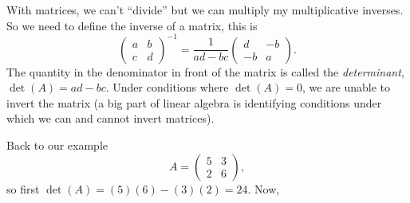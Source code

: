 \documentclass{article}
\begin{document}
With matrices, we can't ``divide'' but we can multiply my multiplicative inverses. So we need to define the inverse of a matrix, this is \[\begin{pmatrix}a&b\\c&d\end{pmatrix}^{-1} = \frac{1}{ad-bc}\begin{pmatrix}d&-b\\-b&a\end{pmatrix}.\] The quantity in the denominator in front of the matrix is called the \emph{determinant}, \(\operatorname{det}(A) = ad-bc\).  Under conditions where \(\operatorname{det}(A)=0\), we are unable to invert the matrix (a big part of linear algebra is identifying conditions under which we can and cannot invert matrices).

Back to our example \[A = \begin{pmatrix}5&3\\2&6\end{pmatrix},\] so first \(\operatorname{det}(A) = (5)(6) - (3)(2) = 24\).  Now, 
\end{document}
